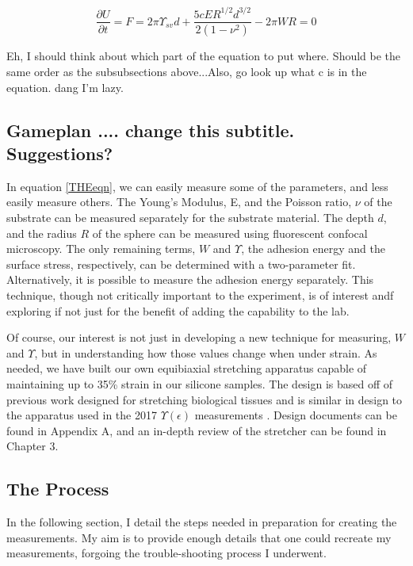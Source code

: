 \begin{equation}
\label{THEeqn}
\frac{\partial U}{\partial t} = F = 2 \pi \Upsilon_{sv}d  + \frac{5cER^{1/2}d^{3/2}}{2 \left( 1-\nu ^2 \right) }  - 2 \pi WR = 0
\end{equation}


Eh, I should think about which part of the equation to put where. Should be the same order as the subsubsections above...Also, go look up what c is in the equation. dang I'm lazy.



\subsection{Gameplan .... change this subtitle. Suggestions?}
In equation \ref{THEeqn}, we can easily measure some of the parameters, and less easily measure others. The Young's Modulus, E, and the Poisson ratio, $\nu$ of the substrate can be measured separately for the substrate material. The depth $d$, and the radius $R$ of the sphere can be measured using fluorescent confocal microscopy. The only remaining terms, $W$ and $\Upsilon$, the adhesion energy and the surface stress, respectively, can be determined with a two-parameter fit. Alternatively, it is possible to measure the adhesion energy separately. This technique, though not critically important to the experiment, is of interest andf exploring if not just for the benefit of adding the capability to the lab.   

Of course, our interest is not just in developing a new technique for measuring, $W$ and $\Upsilon$, but in understanding how those values change when under strain. As needed, we have built our own equibiaxial stretching apparatus capable of maintaining up to 35\% strain in our silicone samples. The design is based off of previous work designed for stretching biological tissues \cite{na2008time} and is similar in design to the apparatus used in the 2017 $\Upsilon(\epsilon)$ measurements \cite{xu2017direct}. Design documents can be found in Appendix A, and an in-depth review of the stretcher can be found in Chapter 3. 

\subsection{The Process}
In the following section, I detail the steps needed in preparation for creating the measurements. My aim is to provide enough details that one could recreate my measurements, forgoing the trouble-shooting process I underwent. 

